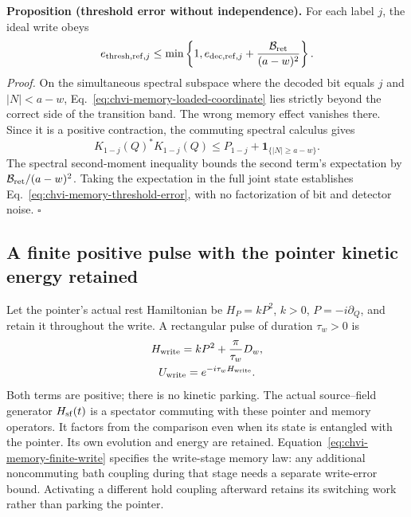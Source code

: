 \noindent\textbf{Proposition (threshold error without independence).}
For each label $j$, the ideal write obeys
\begin{equation}
 e_{{\rm thresh,ref},j}
 \leq\min\left\{1,e_{{\rm dec,ref},j}
                  +\frac{\mathcal B_{\rm ret}}{(a-w)^2}\right\}.
\label{eq:chvi-memory-threshold-error}
\end{equation}
\emph{Proof.} On the simultaneous spectral subspace where the decoded
bit equals $j$ and $|N|<a-w$, Eq.~\eqref{eq:chvi-memory-loaded-coordinate}
lies strictly beyond the correct side of the transition band. The wrong
memory effect vanishes there. Since it is a positive contraction, the
commuting spectral calculus gives
\begin{equation}
 K_{1-j}(Q)^*K_{1-j}(Q)
 \leq P_{1-j}+\mathbf1_{\{|N|\geq a-w\}}.
\end{equation}
The spectral second-moment inequality bounds the second term's expectation
by $\mathcal B_{\rm ret}/(a-w)^2$. Taking the expectation in the full joint
state establishes Eq.~\eqref{eq:chvi-memory-threshold-error}, with no
factorization of bit and detector noise. $\square$

\subsection{A finite positive pulse with the pointer kinetic energy retained}

Let the pointer's actual rest Hamiltonian be $H_P=kP^2$, $k>0$,
$P=-i\partial_Q$, and retain it throughout the write. A rectangular pulse
of duration $\tau_w>0$ is
\begin{equation}
\begin{gathered}
H_{\rm write}=kP^2+\frac{\pi}{\tau_w}D_w,
 \\
 U_{\rm write}=e^{-i\tau_wH_{\rm write}}.
\end{gathered}
\label{eq:chvi-memory-finite-write}
\end{equation}
Both terms are positive; there is no kinetic parking. The actual
source--field generator $H_{\rm sf}(t)$ is a spectator commuting with these pointer
and memory operators. It factors from the comparison even when its state
is entangled with the pointer. Its own evolution and energy are retained.
Equation~\eqref{eq:chvi-memory-finite-write} specifies the write-stage
memory law: any additional noncommuting bath coupling during that stage
needs a separate write-error bound. Activating a different hold coupling
afterward retains its switching work rather than parking the pointer.

